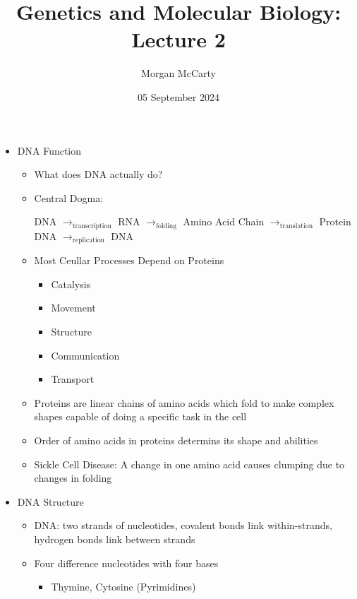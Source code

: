 \documentclass[12pt]{article}
\title{
    Genetics and Molecular Biology: Lecture 2}
\author{Morgan McCarty}
\date{05 September 2024}
\begin{document}
    \maketitle

    \begin{itemize}
        \item DNA Function
        \begin{itemize}
            \item What does DNA actually do?
            \item Central Dogma:
            \begin{center}
                DNA $\rightarrow_{\text{transcription}}$ RNA $\rightarrow_\text{folding}$ Amino Acid Chain $\rightarrow_{\text{translation}}$ Protein \\
                DNA $\rightarrow_{\text{replication}}$ DNA
            \end{center}
            \item Most Ceullar Processes Depend on Proteins
            \begin{itemize}
                \item Catalysis
                \item Movement
                \item Structure
                \item Communication
                \item Transport
            \end{itemize}
            \item Proteins are linear chains of amino acids which fold to make complex shapes capable of doing a specific task in the cell
            \item Order of amino acids in proteins determins its shape and abilities
            \item Sickle Cell Disease: A change in one amino acid causes clumping due to changes in folding
        \end{itemize}
        \item DNA Structure
        \begin{itemize}
            \item DNA: two strands of nucleotides, covalent bonds link within-strands, hydrogen bonds link between strands
            \item Four difference nucleotides with four bases
            \begin{itemize}
                \item Thymine, Cytosine (Pyrimidines)

\end{itemize}
\end{itemize}
\end{itemize}
\end{document}
